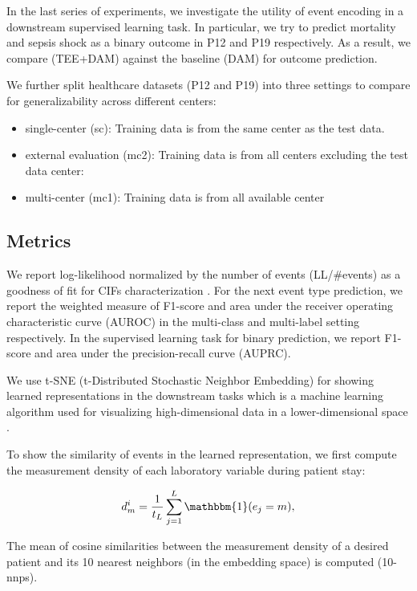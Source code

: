 \documentclass[journal,twoside,web]{ieeecolor}
\begin{document}
In the last series of experiments, we investigate the utility of event encoding in a downstream supervised learning task. In particular, we try to predict mortality and sepsis shock as a binary outcome in P12 and P19 respectively. As a result, we compare (TEE+DAM) against the baseline (DAM) for outcome prediction.

We further split healthcare datasets (P12 and P19) into three settings to compare for generalizability across different centers:

\begin{itemize}
    \item single-center (sc): Training data is from the same center as the test data.  
    \item external evaluation (mc2): Training data is from all centers excluding the test data center:
    \item multi-center (mc1): Training data is from all available center
\end{itemize} 




\subsection*{Metrics}
We report log-likelihood normalized by the number of events (LL/\#events) as a goodness of fit for CIFs characterization \cite*{zhangSelfAttentiveHawkesProcess2020,zuoTransformerHawkesProcess2020a}. For the next event type prediction, we report the weighted measure of F1-score and area under the receiver operating characteristic curve (AUROC) in the multi-class and multi-label setting respectively. In the supervised learning task for binary prediction, we report F1-score and area under the precision-recall curve (AUPRC).

We use t-SNE (t-Distributed Stochastic Neighbor Embedding) for showing learned representations in the downstream tasks which is a machine learning algorithm used for visualizing high-dimensional data in a lower-dimensional space \cite*{maatenVisualizingDataUsing2008}.

To show the similarity of events in the learned representation, we first compute the measurement density of each laboratory variable during patient stay:

\begin{equation}
    d_{m}^{i}=  \frac{1}{t_L} \sum_{j=1}^{L} \mathbbm{1}(e_j=m),
\end{equation}

The mean of cosine similarities between the measurement density of a desired patient and its 10 nearest neighbors (in the embedding space) is computed (10-nnps).
\end{document}
